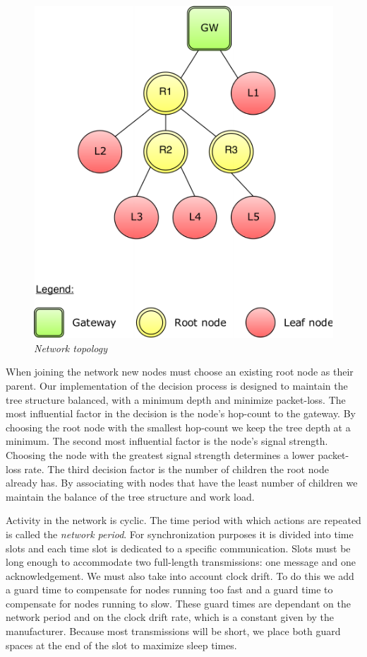 \begin{figure}[ht]
	\begin{center}
		\includegraphics{img/network_topology.pdf}
	\end{center}
	\caption{\small \itshape{Network topology}}
	\label{img:network_topology}
\end{figure}

When joining the network new nodes must choose an existing root node as their
parent. Our implementation of the decision process is designed to maintain the
tree structure balanced, with a minimum depth and minimize packet-loss. The
most influential factor in the decision is the node's hop-count to the gateway.
By choosing the root node with the smallest hop-count we keep the tree depth at
a minimum. The second most influential factor is the node's signal strength.
Choosing the node with the greatest signal strength determines a lower
packet-loss rate. The third decision factor is the number of children the root
node already has. By associating with nodes that have the least number of
children we maintain the balance of the tree structure and work load.

Activity in the network is cyclic. The time period with which actions are
repeated is called the \emph{network period}. For synchronization purposes it
is divided into time slots and each time slot is dedicated to a specific
communication. Slots must be long enough to accommodate two full-length
transmissions: one message and one acknowledgement. We must also take into
account clock drift. To do this we add a guard time to compensate for nodes
running too fast and a guard time to compensate for nodes running to slow.
These guard times are dependant on the network period and on the clock drift
rate, which is a constant given by the manufacturer. Because most transmissions
will be short, we place both guard spaces at the end of the slot to maximize
sleep times.

